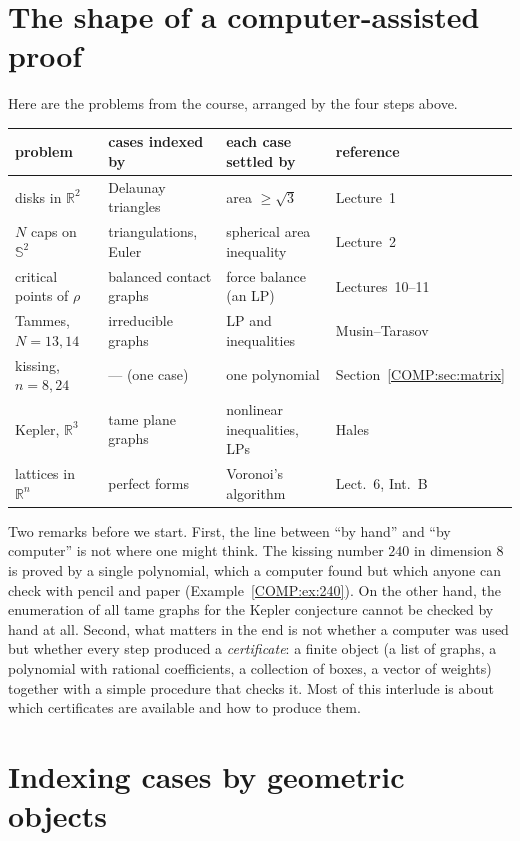 \documentclass[11pt,openany]{book}
\theoremstyle{plain}
\theoremstyle{definition}
\theoremstyle{remark}
\newcommand{\R}{\mathbb{R}}
\newcommand{\Sph}{\mathbb{S}}          %
\begin{document}
\section{The shape of a computer-assisted proof}
\label{COMP:sec:shape}

Here are the problems from the course, arranged by the four steps above.
\begin{center}
\renewcommand{\arraystretch}{1.25}
\small
\begin{tabular}{p{}p{}p{}p{}}
\toprule
problem & cases indexed by & each case settled by & reference\\
\midrule
disks in $\R^2$ & Delaunay triangles & area $\ge\sqrt3$ & Lecture~1\\
$N$ caps on $\Sph^2$ & triangulations, Euler & spherical area inequality & Lecture~2\\
critical points of $\rho$ & balanced contact graphs & force balance (an LP) & Lectures~10--11\\
Tammes, $N{=}13,14$ & irreducible graphs & LP and inequalities & Musin--Tarasov\\
kissing, $n=8,24$ & --- (one case) & one polynomial & Section~\ref{COMP:sec:matrix}\\
Kepler, $\R^3$ & tame plane graphs & nonlinear inequalities, LPs & Hales\\
lattices in $\R^n$ & perfect forms & Voronoi's algorithm & Lect.~6, Int.~B\\
\bottomrule
\end{tabular}
\end{center}
Two remarks before we start. First, the line between ``by hand'' and ``by computer'' is not where one
might think. The kissing number $240$ in dimension $8$ is proved by a single polynomial, which a
computer found but which anyone can check with pencil and paper (Example~\ref{COMP:ex:240}). On the
other hand, the enumeration of all tame graphs for the Kepler conjecture cannot be checked by hand at
all. Second, what matters in the end is not whether a computer was used but whether every step
produced a \emph{certificate}: a finite object (a list of graphs, a polynomial with rational
coefficients, a collection of boxes, a vector of weights) together with a simple procedure that checks
it. Most of this interlude is about which certificates are available and how to produce them.

\section{Indexing cases by geometric objects}
\label{COMP:sec:index}
\end{document}
